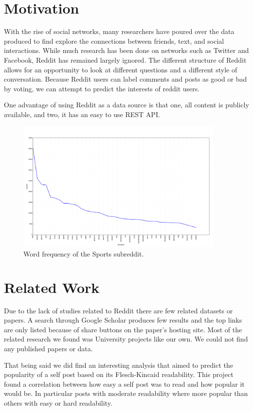 \documentclass[10pt,twocolumn]{article}
\begin{document}
\section{Motivation}
With the rise of social networks, many researchers have poured over the data produced to find explore the connections between friends, text, and social interactions. While much research has been done on networks such as Twitter and Facebook, Reddit has remained largely ignored. The different structure of Reddit allows for an opportunity to look at different questions and a different style of conversation. Because Reddit users can label comments and posts as good or bad by voting, we can attempt to predict the interests of reddit users.

One advantage of using Reddit as a data source is that one, all content is publicly available, and two, it has an easy to use REST API\cite{reddit}. 

\begin{figure}
    \centering
  	\includegraphics[width=0.92\textwidth]{./sports_freq.png}
  	\caption{Word frequency of the Sports subreddit.}
  	\label{fig:RSUencountered}
\end{figure}

\section{Related Work}
Due to the lack of studies related to Reddit there are few related datasets or papers. A search through Google Scholar produces few results and the top links are only listed because of share buttons on the paper's hosting site. Most of the related research we found was University projects like our own. We could not find any published papers or data.

That being said we did find an interesting analysis that aimed to predict the popularity of a self post based on its Flesch-Kincaid readability. This project found a correlation between how easy a self post was to read and how popular it would be. In particular posts with moderate readability where more popular than others with easy or hard readability.
\end{document}
